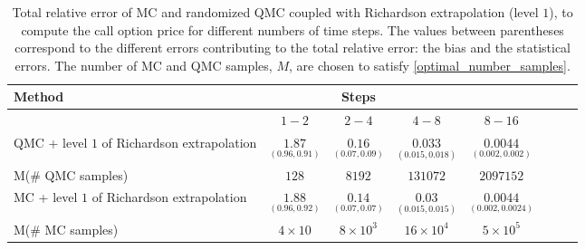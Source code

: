 

\begin{table}[h!]
	\begin{small}
		\centering
		\begin{tabular}{l*{6}{c}r}
			\toprule[1.5pt]
			Method & & Steps  & &     \\
			\hline
			& $1-2$ & $2-4$ & $4-8$   & $8-16$  \\
			\hline	
			QMC + level $1$ of  Richardson extrapolation &$\underset{(0.96,0.91)}{\mathbf{1.87}}$  & $\underset{(0.07,0.09)}{\mathbf{0.16}}$ & $\underset{(0.015,0.018)}{\mathbf{0.033}}$ & $\underset{(0.002,0.002)}{\mathbf{0.0044}}$  \\
			M(\# QMC samples) & $128$  & $8192$ & $
			131072$ & $
			2097152$ \\
			\hline
			
			MC + level $1$ of  Richardson extrapolation &$\underset{(0.96,0.92)}{\mathbf{1.88}}$  & $\underset{(0.07,0.07)}{\mathbf{0.14}}$ & $\underset{(0.015,0.015)}{\mathbf{0.03}}$  & $\underset{(0.002,0.0024)}{\mathbf{0.0044}}$\\
			M(\# MC samples) & $4 \times 10$  & $8 \times 10^3$ & $16 \times 10^4$ & $5 \times 10^5$  \\
			\bottomrule[1.25pt]
		\end{tabular}
		\caption{Total relative error of MC and randomized QMC coupled with Richardson extrapolation (level $1$), to compute the call option price  for different numbers of time steps. The values between parentheses correspond to the different errors contributing to the total relative error: the bias and the statistical errors. The number of MC and QMC samples, $M$, are chosen to satisfy \eqref{optimal_number_samples}.}
		\label{Total  error of MISC and MC to compute Call option price of the different tolerances for different number of time steps. Case set $2$ parameters, with Richardson extrapolation(level $1$). The numbers between parentheses are the corresponding absolute errors,relative}
	\end{small}
\end{table}
\FloatBarrier


